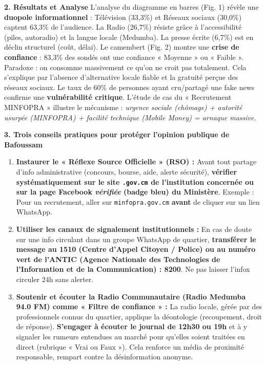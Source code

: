 \documentclass[11pt]{article}
\newcommand{\cle}[1]{{\popxbold\color{popdark}#1}}
\begin{document}
\begin{exoresolu}
\textbf{2. Résultats et Analyse}
L'analyse du diagramme en barres (Fig. 1) révèle une \textbf{duopole informationnel} : Télévision (33,3\%) et Réseaux sociaux (30,0\%) captent 63,3\% de l'audience. La Radio (26,7\%) résiste grâce à l'accessibilité (piles, autoradio) et la langue locale (Medumba). La presse écrite (6,7\%) est en déclin structurel (coût, délai).
Le camembert (Fig. 2) montre une \textbf{crise de confiance} : 83,3\% des sondés ont une confiance « Moyenne » ou « Faible ». Paradoxe : on consomme massivement ce qu'on ne croit pas totalement. Cela s'explique par l'absence d'alternative locale fiable et la gratuité perçue des réseaux sociaux.
Le taux de 60\% de personnes ayant cru/partagé une \cle{fake news} confirme une \textbf{vulnérabilité critique}. L'étude de cas du « Recrutement MINFOPRA » illustre le mécanisme : \emph{urgence sociale (chômage) + autorité usurpée (MINFOPRA) + facilité technique (Mobile Money) = arnaque massive}.

\textbf{3. Trois conseils pratiques pour protéger l'opinion publique de Bafoussam}
\begin{enumerate}
    \item \textbf{Instaurer le « Réflexe Source Officielle » (RSO) :} Avant tout partage d'info administrative (concours, bourse, aide, alerte sécurité), \textbf{vérifier systématiquement sur le site \texttt{.gov.cm} de l'institution concernée ou sur la page Facebook \emph{vérifiée} (badge bleu) du Ministère}. Exemple : Pour un recrutement, aller sur \texttt{minfopra.gov.cm} \textbf{avant} de cliquer sur un lien WhatsApp.
    \item \textbf{Utiliser les canaux de signalement institutionnels :} En cas de doute sur une info circulant dans un groupe WhatsApp de quartier, \textbf{transférer le message au 1510 (Centre d'Appel Citoyen / Police) ou au numéro vert de l'ANTIC (Agence Nationale des Technologies de l'Information et de la Communication) : 8200}. Ne pas laisser l'infox circuler 24h sans alerter.
    \item \textbf{Soutenir et écouter la Radio Communautaire (Radio Medumba 94.0 FM) comme « Filtre de confiance » :} La radio locale, gérée par des professionnels connus du quartier, applique la déontologie (recoupement, droit de réponse). \textbf{S'engager à écouter le journal de 12h30 ou 19h} et à y signaler les rumeurs entendues au marché pour qu'elles soient traitées en direct (rubrique « Vrai ou Faux »). Cela renforce un média de proximité responsable, rempart contre la désinformation anonyme.
\end{enumerate}


\end{exoresolu}
\end{document}
